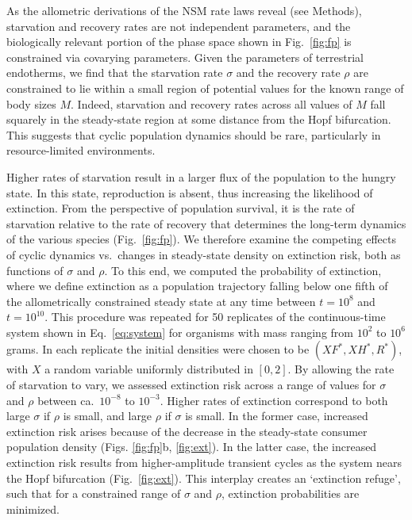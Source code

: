 \documentclass[twocolumn,preprintnumbers,amsmath,amssymb,superscriptaddress]{revtex4}
\begin{document}
As the allometric derivations of the NSM rate laws reveal (see Methods),
starvation and recovery rates are not independent parameters, and the
biologically relevant portion of the phase space shown in Fig.~\ref{fig:fp}
is constrained via covarying parameters.  Given the parameters of terrestrial
endotherms, we find that the starvation rate $\sigma$ and the recovery rate
$\rho$ are constrained to lie within a small region of potential values for
the known range of body sizes $M$.  Indeed, starvation and recovery rates
across all values of $M$ fall squarely in the steady-state region at some
distance from the Hopf bifurcation.  This suggests that cyclic population
dynamics should be rare, particularly in resource-limited environments.

Higher rates of starvation result in a larger flux of the population to the hungry state.
In this state, reproduction is absent, thus increasing the likelihood of extinction.  From the perspective of population survival, it is the rate of starvation relative to the rate of recovery that determines the long-term dynamics of the various species (Fig.~\ref{fig:fp}).
We therefore examine the competing effects of cyclic dynamics vs.\ changes in steady-state density on extinction risk, both as functions of $\sigma$ and $\rho$.
To this end, we computed the probability of extinction, where we define extinction as a population trajectory falling below one fifth of the allometrically constrained steady state at any time between $t=10^8$ and $t=10^{10}$.
This procedure was repeated for 50 replicates of the continuous-time system shown in Eq.~\ref{eq:system} for organisms with mass ranging from $10^2$ to $10^6$ grams.
In each replicate the initial densities were chosen to be $(XF^*,XH^*,R^*)$,
with $X$ a random variable uniformly distributed in $[0,2]$.  By allowing the
rate of starvation to vary, we assessed extinction risk across a range of
values for $\sigma$ and $\rho$ between ca.\ $10^{-8}$ to
$10^{-3}$. %
Higher rates of extinction correspond to both large $\sigma$ if $\rho$ is
small, and large $\rho$ if $\sigma$ is small.  In the former case, increased
extinction risk arises because of the decrease in the steady-state consumer
population density (Figs. \ref{fig:fp}b, \ref{fig:ext}).  In the latter case,
the increased extinction risk results from higher-amplitude transient cycles
as the system nears the Hopf bifurcation (Fig.~\ref{fig:ext}).  This
interplay creates an `extinction refuge', such that for a constrained range
of $\sigma$ and $\rho$, extinction probabilities are minimized.
\end{document}
